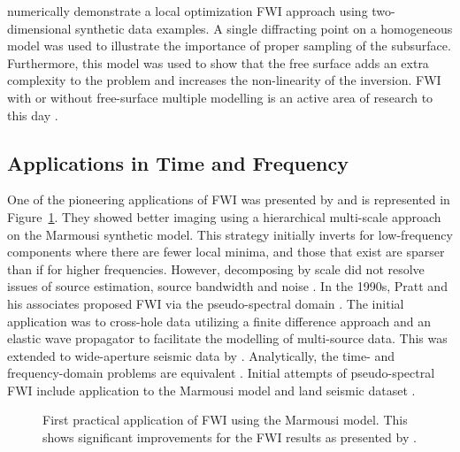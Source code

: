 \cite{Gauthier1986} numerically demonstrate a local optimization FWI approach using two-dimensional synthetic data examples. A single diffracting point on a homogeneous model was used to illustrate the importance of proper sampling of the subsurface. Furthermore, this model was used to show that the free surface adds an extra complexity to the problem and increases the non-linearity of the inversion. FWI with or without free-surface multiple modelling is an active area of research to this day \citep{Komatitsch2002,Bergen2019}. 

\subsection{Applications in Time and Frequency}
One of the pioneering applications of FWI was presented by \cite{Bunks1995} and is represented in Figure~\ref{fig:first_practical_fwi}. They showed better imaging using a hierarchical multi-scale approach on the Marmousi synthetic model. This strategy initially inverts for low-frequency components where there are fewer local minima, and those that exist are sparser than if for higher frequencies. However, decomposing by scale did not resolve issues of source estimation, source bandwidth and noise \citep{Bunks1995}. In the 1990s, Pratt and his associates proposed FWI via the pseudo-spectral domain \citep{Pratt1990a, Pratt1990b, Pratt1991}. The initial application was to cross-hole data utilizing a finite difference approach and an elastic wave propagator to facilitate the modelling of multi-source data. This was extended to wide-aperture seismic data by \cite{Pratt1996}. Analytically, the time- and frequency-domain problems are equivalent \citep{Virieux2009}. Initial attempts of pseudo-spectral FWI include application to the Marmousi model \citep{Sirgue2004} and land seismic dataset \citep{Operto2004}.

\begin{figure}[!ht]
	\centering
	\caption[First practical application of FWI using the Marmousi model]{First practical application of FWI using the Marmousi model. This shows significant improvements for the FWI results as presented by \cite{Bunks1995}.}        
	\label{fig:first_practical_fwi}
\end{figure}

